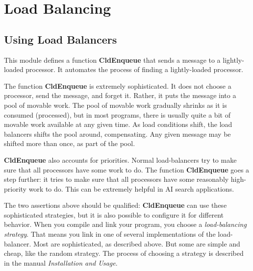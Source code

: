 \chapter{Load Balancing}

\section{Using \converse{} Load Balancers}

This module defines a function {\bf CldEnqueue} that sends a message
to a lightly-loaded processor.  It automates the process of finding a
lightly-loaded processor.  

The function {\bf CldEnqueue} is extremely sophisticated.  It does not
choose a processor, send the message, and forget it.  Rather, it puts
the message into a pool of movable work.  The pool of movable work
gradually shrinks as it is consumed (processed), but in most programs,
there is usually quite a bit of movable work available at any given
time.  As load conditions shift, the load balancers shifts the pool
around, compensating.  Any given message may be shifted more than
once, as part of the pool.

{\bf CldEnqueue} also accounts for priorities.  Normal load-balancers
try to make sure that all processors have some work to do.  The
function {\bf CldEnqueue} goes a step further: it tries to make sure
that all processors have some reasonably high-priority work to do.
This can be extremely helpful in AI search applications.

The two assertions above should be qualified: {\bf CldEnqueue} can use
these sophisticated strategies, but it is also possible to configure
it for different behavior.  When you compile and link your program, you
choose a {\sl load-balancing strategy}.  That means you link in one of
several implementations of the load-balancer.  Most are sophisticated,
as described above.  But some are simple and cheap, like the random
strategy.  The process of choosing a strategy is described in the
manual {\em \converse{} Installation and Usage}.


